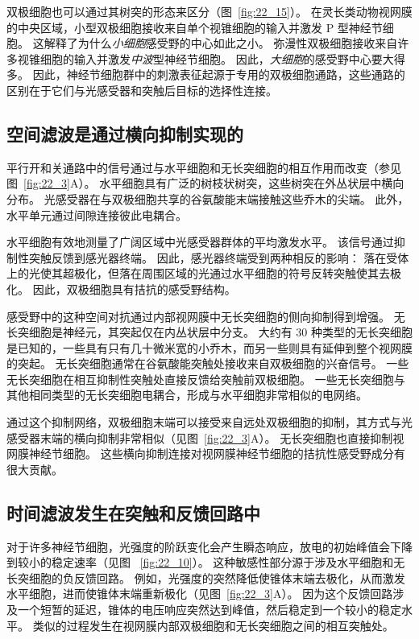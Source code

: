 双极细胞也可以通过其树突的形态来区分（图~\ref{fig:22_15}）。
在灵长类动物视网膜的中央区域，小型双极细胞接收来自单个视锥细胞的输入并激发 P 型神经节细胞。
这解释了为什么\textit{小细胞}感受野的中心如此之小。
弥漫性双极细胞接收来自许多视锥细胞的输入并激发\textit{中波}型神经节细胞。
因此，\textit{大细胞}的感受野中心要大得多。
因此，神经节细胞群中的刺激表征起源于专用的双极细胞通路，这些通路的区别在于它们与光感受器和突触后目标的选择性连接。



\subsection{空间滤波是通过横向抑制实现的}

平行开和关通路中的信号通过与水平细胞和无长突细胞的相互作用而改变（参见图~\ref{fig:22_3}A）。
水平细胞具有广泛的树枝状树突，这些树突在外丛状层中横向分布。
光感受器在与双极细胞共享的谷氨酸能末端接触这些乔木的尖端。
此外，水平单元通过间隙连接彼此电耦合。


水平细胞有效地测量了广阔区域中光感受器群体的平均激发水平。
该信号通过抑制性突触反馈到感光器终端。
因此，感光器终端受到两种相反的影响：
落在受体上的光使其超极化，但落在周围区域的光通过水平细胞的符号反转突触使其去极化。
因此，双极细胞具有拮抗的感受野结构。


感受野中的这种空间对抗通过内部视网膜中无长突细胞的侧向抑制得到增强。
无长突细胞是神经元，其突起仅在内丛状层中分支。
大约有 30 种类型的无长突细胞是已知的，一些具有只有几十微米宽的小乔木，而另一些则具有延伸到整个视网膜的突起。
无长突细胞通常在谷氨酸能突触处接收来自双极细胞的兴奋信号。
一些无长突细胞在相互抑制性突触处直接反馈给突触前双极细胞。
一些无长突细胞与其他相同类型的无长突细胞电耦合，形成与水平细胞非常相似的电网络。


通过这个抑制网络，双极细胞末端可以接受来自远处双极细胞的抑制，其方式与光感受器末端的横向抑制非常相似（见图~\ref{fig:22_3}A）。
无长突细胞也直接抑制视网膜神经节细胞。
这些横向抑制连接对视网膜神经节细胞的拮抗性感受野成分有很大贡献。



\subsection{时间滤波发生在突触和反馈回路中}

对于许多神经节细胞，光强度的阶跃变化会产生瞬态响应，放电的初始峰值会下降到较小的稳定速率（见图 ~\ref{fig:22_10}）。
这种敏感性部分源于涉及水平细胞和无长突细胞的负反馈回路。
例如，光强度的突然降低使锥体末端去极化，从而激发水平细胞，进而使锥体末端重新极化（见图~\ref{fig:22_3}A）。
因为这个反馈回路涉及一个短暂的延迟，锥体的电压响应突然达到峰值，然后稳定到一个较小的稳定水平。
类似的过程发生在视网膜内部双极细胞和无长突细胞之间的相互突触处。


